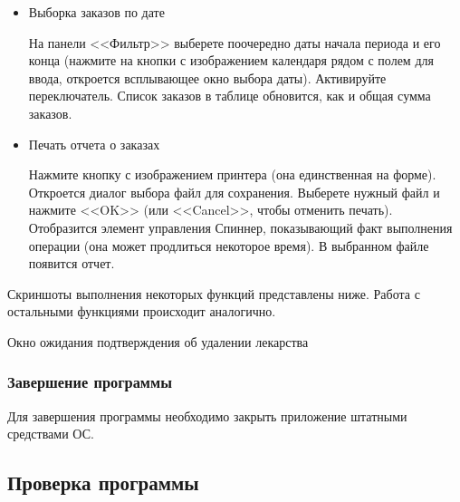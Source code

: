 \begin{itemize}
    \item Выборка заказов по дате

        На панели <<Фильтр>> выберете поочередно даты начала периода и его
        конца (нажмите на кнопки с изображением календаря рядом с полем для
        ввода, откроется всплывающее окно выбора даты). Активируйте
        переключатель. Список заказов в таблице обновится, как и общая
        сумма заказов.

    \item Печать отчета о заказах

        Нажмите кнопку с изображением принтера (она единственная на форме).
        Откроется диалог выбора файл для сохранения. Выберете нужный файл и
        нажмите <<OK>> (или <<Cancel>>, чтобы отменить печать). Отобразится
        элемент управления Спиннер, показывающий факт выполнения операции (она
        может продлиться некоторое время). В выбранном файле появится отчет.
\end{itemize}

Скриншоты выполнения некоторых функций представлены ниже. Работа с остальными
функциями происходит аналогично.

{Окно ожидания подтверждения об удалении лекарства}{}

\subsubsection{Завершение программы}

Для завершения программы необходимо закрыть приложение штатными средствами ОС.

\subsection{Проверка программы}

